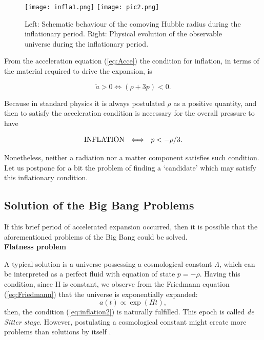 \documentclass{rmaa}
\def\beq{\begin{equation}}
\def\eeq{\end{equation}}
\begin{document}
\begin{figure}[ht] 
\texttt{[image: infla1.png]}
\texttt{[image: pic2.png]}
\caption{Left: Schematic behaviour 
of the comoving Hubble radius during the inflationary period. Right: 
Physical evolution of the observable universe during the inflationary period.}%
\label{fig:Liddle}
\end{figure}

From the acceleration equation (\ref{eq:Acce}) the condition for inflation, in 
terms of the material required to drive the expansion, is

\beq
\ddot a>0 \Longleftrightarrow (\rho +3p)<0.
\label{gg}
\eeq

\noindent
Because in standard physics it is always postulated $\rho$ as a positive quantity, and then
to satisfy the acceleration condition is necessary for the overall pressure to have 

\beq 
{\rm INFLATION} ~~ \Longleftrightarrow~~p<-\rho/3.
\eeq

\noindent
Nonetheless, neither a radiation nor a matter component satisfies such condition. 
Let us postpone for a bit the problem of finding a `candidate' which may satisfy this inflationary condition.



\subsection{Solution of the Big Bang Problems}
If this brief period of accelerated expansion occurred, then it is possible that the 
aforementioned problems of the Big Bang could be solved.
\\

\noindent
\textbf {Flatness problem}
\vskip 6pt
 
A typical solution is a universe possessing a cosmological constant $\Lambda$, which can be 
interpreted as a perfect fluid with equation of state $p=-\rho$. Having this condition, 
since H is constant, we observe from the Friedmann equation (\ref{eq:Friedmann}) that 
the universe is exponentially expanded:
%
\beq
a(t)\propto \exp(Ht),
\eeq
then, the condition  
(\ref{eq:inflation2}) is naturally fulfilled. This epoch is called \textit{de Sitter stage}.
However, postulating a cosmological constant might create more problems than
solutions by itself \citep{Carrol01}.
\\
\end{document}
